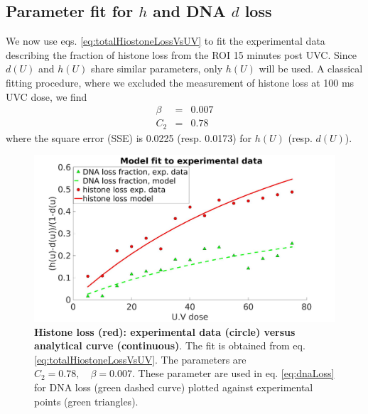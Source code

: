 \documentclass[12pt]{article}
\begin{document}
\subsection{Parameter fit for $h$ and DNA $d$ loss}\label{subsection:parameterFit}
We now use eqs. \ref{eq:totalHiostoneLossVsUV} to fit the experimental data describing the fraction of histone loss from the ROI 15 minutes post UVC. Since $d(U)$ and $h(U)$ share similar parameters, only $h(U)$ will be used. A classical fitting procedure, where we excluded the measurement of histone loss at 100 ms UVC dose, we find
\begin{eqnarray*}
\beta &=&  0.007\\
C_2   &=&  0.78
\end{eqnarray*}
where the square error (SSE) is 0.0225 (resp. 0.0173) for $h(U)$ (resp. $d(U)$).
\begin{figure}[http!]
\centering
\includegraphics[width=0.5\linewidth, height=0.3\textheight]{histoneAndDnaVsUvDoseModelFit}
\caption{\textbf{Histone loss (red): experimental data (circle) versus analytical curve (continuous)}. The fit is obtained from  eq. \ref{eq:totalHiostoneLossVsUV}.  The parameters are $C_2 =0.78,\quad \beta=0.007$. These parameter are used in eq. \ref{eq:dnaLoss} for DNA loss (green dashed curve) plotted against experimental points (green triangles).}
\label{fig:histoneAndDnaVsUvDoseModelFit}
\end{figure}

\end{document}
